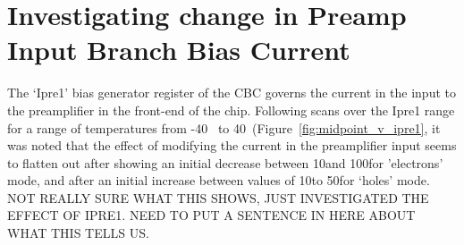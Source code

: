 
\section{Investigating change in Preamp Input Branch Bias Current}
\label{s:investigating_change_in_preamp_input_branch_bias_current}
The `Ipre1' bias generator register of the CBC governs the current in the input to the preamplifier in the
front-end of the chip. Following scans over the Ipre1 range for a range of temperatures from -40~\degreeCelsius
to 40~\degreeCelsius (Figure~\ref{fig:midpoint_v_ipre1}, it was noted that the effect of modifying the current in
the preamplifier input seems to flatten out after showing an initial decrease between 10\uA and 100\uA for
'electrons' mode, and after an initial increase between values of 10\uA to 50\uA for `holes' mode. NOT REALLY
SURE WHAT THIS SHOWS, JUST INVESTIGATED THE EFFECT OF IPRE1. NEED TO PUT A SENTENCE IN HERE ABOUT WHAT THIS
TELLS US.

